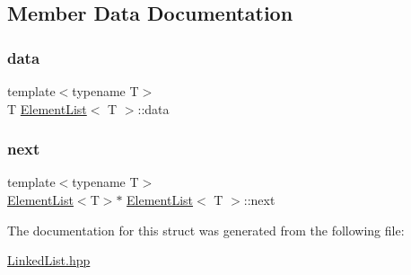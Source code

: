 \subsection{Member Data Documentation}
\mbox{\label{struct_element_list_a4c3bbe183d5a854d51e193b21075c884}} 
\subsubsection{\texorpdfstring{data}{data}}
{\footnotesize\ttfamily template$<$typename T$>$ \\
T \mbox{\hyperlink{struct_element_list}{Element\+List}}$<$ T $>$\+::data}

\mbox{\label{struct_element_list_ae15f34d3109949237cf3ba98a074d402}} 
\subsubsection{\texorpdfstring{next}{next}}
{\footnotesize\ttfamily template$<$typename T$>$ \\
\mbox{\hyperlink{struct_element_list}{Element\+List}}$<$T$>$$\ast$ \mbox{\hyperlink{struct_element_list}{Element\+List}}$<$ T $>$\+::next}



The documentation for this struct was generated from the following file\+:\begin{DoxyCompactItemize}
\item 
\mbox{\hyperlink{_linked_list_8hpp}{Linked\+List.\+hpp}}\end{DoxyCompactItemize}
